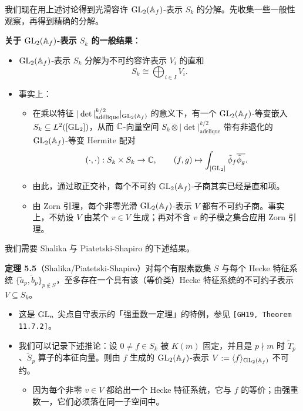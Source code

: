 我们现在用上述讨论得到光滑容许 $\operatorname{GL}_2(\mathbb{A}_f)$-表示 $S_k$ 的分解。先收集一些一般性观察，再得到精确的分解。

\textbf{关于 $\operatorname{GL}_2(\mathbb{A}_f)$-表示 $S_k$ 的一般结果}：
\begin{itemize}
\item $\operatorname{GL}_2(\mathbb{A}_f)$-表示 $S_k$ 分解为不可约容许表示 $V_i$ 的直和
\[
S_k\cong\bigoplus_{i\in I}V_i.
\]
\item 事实上：
\begin{itemize}
\item 在乘以特征 $|\det|_{\mathrm{ad\acute elique}}^{k/2}|_{\operatorname{GL}_2(\mathbb{A}_f)}$ 的意义下，有一个 $\operatorname{GL}_2(\mathbb{A}_f)$-等变嵌入 $S_k\subseteq L^2([\operatorname{GL}_2])$，从而 $\mathbb{C}$-向量空间 $S_k\otimes|\det|_{\mathrm{ad\acute elique}}^{k/2}$ 带有非退化的 $\operatorname{GL}_2(\mathbb{A}_f)$-等变 Hermite 配对
\[
(\cdot,\cdot):S_k\times S_k\to\mathbb{C},\qquad
(f,g)\mapsto\int_{[\operatorname{GL}_2]}\tilde\phi_f\overline{\tilde\phi_g}.
\]
\item 由此，通过取正交补，每个不可约 $\operatorname{GL}_2(\mathbb{A}_f)$-子商其实已经是直和项。
\item 由 Zorn 引理，每个非零光滑 $\operatorname{GL}_2(\mathbb{A}_f)$-表示 $V$ 都有不可约子商。事实上，不妨设 $V$ 由某个 $v\in V$ 生成；再对不含 $v$ 的子模之集合应用 Zorn 引理。
\end{itemize}
\end{itemize}

我们需要 Shalika 与 Piatetski-Shapiro 的下述结果。

\noindent\textbf{定理 5.5}（Shalika/Piatetski-Shapiro）\label{thm:5.5}\quad 对每个有限素数集 $S$ 与每个 Hecke 特征系统 $\{\tilde a_p,\tilde b_p\}_{p\notin S}$，至多存在一个具有该（等价类）Hecke 特征系统的不可约子表示 $V\subseteq S_k$。

\begin{itemize}
\item 这是 $\operatorname{GL}_n$ 尖点自守表示的「强重数一定理」的特例，参见 \texttt{[GH19, Theorem 11.7.2]}。
\item 我们可以记录下述推论：设 $0\neq f\in S_k$ 被 $K(m)$ 固定，并且是 $p\nmid m$ 时 $\tilde T_p$、$\tilde S_p$ 算子的本征向量。则由 $f$ 生成的 $\operatorname{GL}_2(\mathbb{A}_f)$-表示 $V:=\langle f\rangle_{\operatorname{GL}_2(\mathbb{A}_f)}$ 不可约。
\begin{itemize}
\item 因为每个非零 $v\in V$ 都给出一个 Hecke 特征系统，它与 $f$ 的等价；由强重数一，它们必须落在同一子空间中。
\end{itemize}
\end{itemize}

